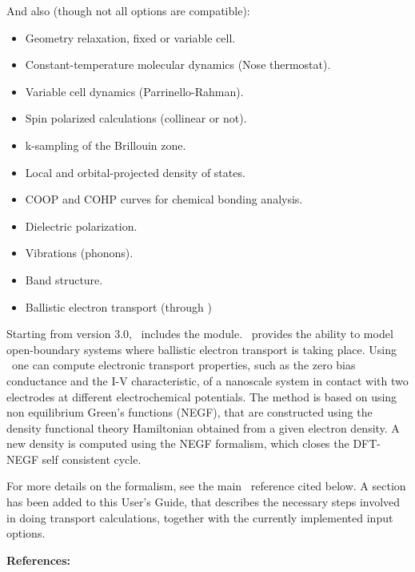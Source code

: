 And also (though not all options are compatible):
\begin{itemize}
\item Geometry relaxation, fixed or variable cell.
\item Constant-temperature molecular dynamics (Nose thermostat).
\item Variable cell dynamics (Parrinello-Rahman).
\item Spin polarized calculations (collinear or not).
\item k-sampling of the Brillouin zone.
\item Local and orbital-projected density of states.
\item COOP and COHP curves for chemical bonding analysis.
\item Dielectric polarization.
\item Vibrations (phonons).
\item Band structure.
\item Ballistic electron transport (through \tsiesta)
\end{itemize}


Starting from version 3.0, \siesta\ includes the \tsiesta{}
module. \tsiesta\ provides the ability to model open-boundary systems where ballistic
electron transport is taking place.  Using \tsiesta\ one can compute electronic
transport properties, such as the zero bias conductance and the I-V characteristic, of a
nanoscale system in contact with two electrodes at different electrochemical potentials.
The method is based on using non equilibrium Green's functions (NEGF), that are
constructed using the density functional theory Hamiltonian obtained from a given electron
density. A new density is computed using the NEGF formalism, which closes the DFT-NEGF
self consistent cycle.

For more details on the formalism, see the main \tsiesta\
reference cited below. A section has been added to this User's Guide,
that describes the necessary steps involved in doing transport
calculations, together with the currently implemented input options.

\vspace{0.5cm}
{\large \textbf{References:} }

